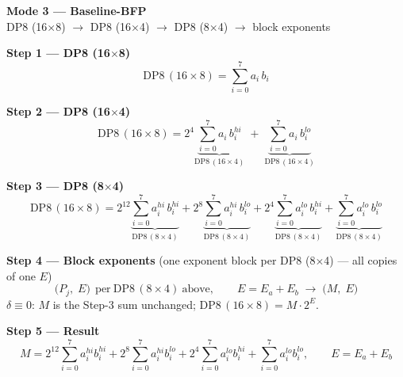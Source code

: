 \documentclass[fleqn]{article}
\newcommand{\DPop}[3]{\mathrm{DP#1}\,(#2\!\times\!#3)}
\begin{document}
\begin{center}
{\LARGE \textbf{Mode 3 --- Baseline-BFP}}\\[4pt]
{\large DP8 (16$\times$8) $\rightarrow$ DP8 (16$\times$4) $\rightarrow$ DP8 (8$\times$4) $\rightarrow$ block exponents}
\end{center}

\vspace{0.5em}

\textbf{Step 1 --- DP8 (16$\times$8)}
\[ \DPop{8}{16}{8} = \sum_{i=0}^{7} a_i \, b_i \]

\vspace{0.5em}

\textbf{Step 2 --- DP8 (16$\times$4)}
\[
\DPop{8}{16}{8}
  = 2^{4} \underbrace{\sum_{i=0}^{7} a_i \, b_i^{hi}}_{\DPop{8}{16}{4}}
  \; + \; \underbrace{\sum_{i=0}^{7} a_i \, b_i^{lo}}_{\DPop{8}{16}{4}}
\]

\vspace{0.5em}

\textbf{Step 3 --- DP8 (8$\times$4)}
\[
\DPop{8}{16}{8}
  = 2^{12} \underbrace{\sum_{i=0}^{7} a_i^{hi} \, b_i^{hi}}_{\DPop{8}{8}{4}}
  + 2^{8} \underbrace{\sum_{i=0}^{7} a_i^{hi} \, b_i^{lo}}_{\DPop{8}{8}{4}}
  + 2^{4} \underbrace{\sum_{i=0}^{7} a_i^{lo} \, b_i^{hi}}_{\DPop{8}{8}{4}}
  + \underbrace{\sum_{i=0}^{7} a_i^{lo} \, b_i^{lo}}_{\DPop{8}{8}{4}}
\]

\vspace{0.5em}

\textbf{Step 4 --- Block exponents}\quad
{\small(one exponent block per DP8 (8$\times$4) --- all copies of one $E$)}
\[
\big(P_j,\; E\big)\ \ \text{per}\ \DPop{8}{8}{4}\ \text{above}, \qquad E = E_a + E_b
\;\longrightarrow\;
\big(M,\; E\big)
\]
$\delta\equiv0$: $M$ is the Step-3 sum unchanged; \quad $\DPop{8}{16}{8}=M\cdot2^{E}$.

\vspace{0.5em}

\textbf{Step 5 --- Result}
\[
\boxed{\;
M = 2^{12}\!\sum_{i=0}^{7} a_i^{hi} b_i^{hi}
  + 2^{8}\!\sum_{i=0}^{7} a_i^{hi} b_i^{lo}
  + 2^{4}\!\sum_{i=0}^{7} a_i^{lo} b_i^{hi}
  + \sum_{i=0}^{7} a_i^{lo} b_i^{lo},
\qquad E = E_a + E_b
\;}
\]
\end{document}
